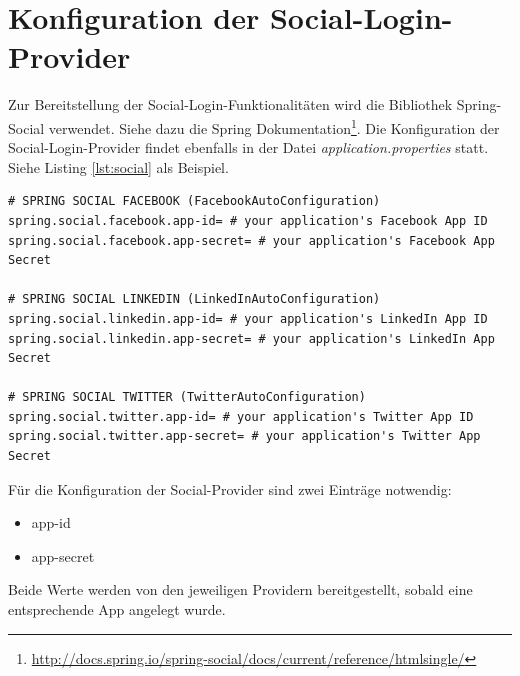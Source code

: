 \section{Konfiguration der Social-Login-Provider}\label{s_config_social}
Zur Bereitstellung der Social-Login-Funktionalitäten wird die Bibliothek Spring-Social verwendet. Siehe dazu die Spring Dokumentation\footnote{\url{http://docs.spring.io/spring-social/docs/current/reference/htmlsingle/}}.
Die Konfiguration der Social-Login-Provider findet ebenfalls in der Datei \emph{application.properties} statt.
Siehe Listing \ref{lst:social} als Beispiel.
   \begin{lstlisting}[caption={Konfiguration der Social-Login-Provider},label={lst:social}]
# SPRING SOCIAL FACEBOOK (FacebookAutoConfiguration)
spring.social.facebook.app-id= # your application's Facebook App ID
spring.social.facebook.app-secret= # your application's Facebook App Secret

# SPRING SOCIAL LINKEDIN (LinkedInAutoConfiguration)
spring.social.linkedin.app-id= # your application's LinkedIn App ID
spring.social.linkedin.app-secret= # your application's LinkedIn App Secret

# SPRING SOCIAL TWITTER (TwitterAutoConfiguration)
spring.social.twitter.app-id= # your application's Twitter App ID
spring.social.twitter.app-secret= # your application's Twitter App Secret
   \end{lstlisting}
   
   Für die Konfiguration der Social-Provider sind zwei Einträge notwendig:
   
   \begin{itemize}
   \item app-id
   \item app-secret
   \end{itemize}
   
   Beide Werte werden von den jeweiligen Providern bereitgestellt, sobald eine entsprechende App angelegt wurde.